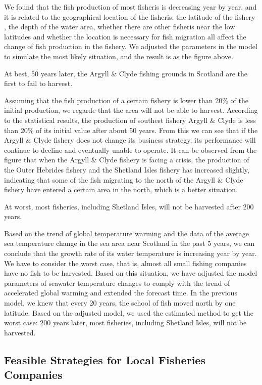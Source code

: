 \documentclass{mcmthesis}
\numberwithin{figure}{section}
\numberwithin{table}{section}
\begin{document}
We found that the fish production of most fisheris is decreasing year by year, and it is related to the geographical location of the fisheris: the latitude of the fishery , the depth of the water area, whether there are other fisheris near the low latitudes and  whether the location is necessary for fish migration all affect the change of fish production in the fishery. We adjusted the parameters in the model to simulate the most likely situation, and the result is as the figure above.

At best, 50 years later, the Argyll \& Clyde fishing grounds in Scotland are the first to fail to harvest.

Assuming that the fish production of a certain fishery is lower than 20\% of the initial production, we regarde that the area will not be able to harvest. According to the statistical results, the production of southest fishery Argyll \& Clyde is less than 20\% of its initial value after about 50 years. From this we can see that if the Argyll \& Clyde fishery does not change its business strategy, its performance will continue to decline and eventually unable to operate. It can be observed from the figure that when the Argyll \& Clyde fishery is facing a crisis, the production of the Outer Hebrides fishery and the Shetland Isles fishery has increased slightly, indicating that some of the fish migrating to the north of the Argyll \& Clyde fishery have entered a certain area in the north, which is a better situation.

At worst, most fisheries, including Shetland Isles, will not be harvested after 200 years.

Based on the trend of global temperature warming and the data of the average sea temperature change in the sea area near Scotland in the past 5 years, we can conclude that the growth rate of its water temperature is increasing year by year. We have to consider the worst case, that is, almost all small fishing companies have no fish to be harvested. Based on this situation, we have adjusted the model parameters of seawater temperature changes to comply with the trend of accelerated global warming and extended the forecast time. In the previous model, we knew that every 20 years, the school of fish moved north by one latitude. Based on the adjusted model, we used the estimated method to get the worst case: 200 years later, most fisheries, including Shetland Isles, will not be harvested.

\subsection{Feasible Strategies for Local Fisheries Companies}
\end{document}
